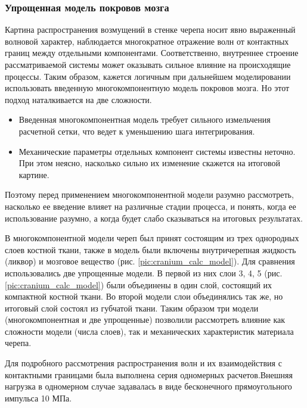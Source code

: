 \clearpage
\newpage

\subsubsection*{Упрощенная модель покровов мозга}

Картина распространения возмущений в стенке черепа носит явно выраженный волновой характер, наблюдается многократное отражение волн от контактных границ между отдельными компонентами. Соответственно, внутреннее строение рассматриваемой системы может оказывать сильное влияние на происходящие процессы. Таким образом, кажется логичным при дальнейшем моделировании использовать введенную многокомпонентную модель покровов мозга. Но этот подход наталкивается на две сложности.

\begin{itemize}

\item Введенная многокомпонентная модель требует сильного измельчения расчетной сетки, что ведет к уменьшению шага интегрирования.

\item Механические параметры отдельных компонент системы известны неточно. При этом неясно, насколько сильно их изменение скажется на итоговой картине.

\end{itemize}

Поэтому перед применением многокомпонентной модели разумно рассмотреть, насколько ее введение влияет на различные стадии процесса, и понять, когда ее использование разумно, а когда будет слабо сказываться на итоговых результатах.

В многокомпонентной модели череп был принят состоящим из трех однородных слоев костной ткани, также в модель были включены внутричерепная жидкость (ликвор) и мозговое вещество (рис. \ref{pic:cranium_calc_model}). Для сравнения использовались две упрощенные модели. В первой из них слои 3, 4, 5 (рис. \ref{pic:cranium_calc_model}) были объединены в один слой, состоящий их компактной костной ткани. Во второй модели слои объединялись так же, но итоговый слой состоял из губчатой ткани. Таким образом три модели (многокомпонентная и две упрощенные) позволили рассмотреть влияние как сложности модели (числа слоев), так и механических характеристик материала черепа.

Для подробного рассмотрения распространения волн и их взаимодействия с контактными границами была выполнена серия одномерных расчетов.Внешняя нагрузка в одномерном случае задавалась в виде бесконечного прямоугольного импульса 10 МПа.

